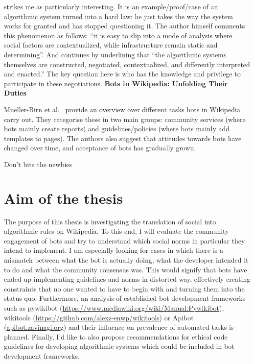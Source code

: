 \documentclass[pdftex,a4paper,11pt]{scrartcl}
\begin{document}
strikes me as particularly interesting.
It is an example/proof/case of an algorithmic system turned into a hard law: he just takes the way the system works for granted and has stopped questioning it.
The author himself comments this phenomenon as follows:
``it is easy to slip into a mode of analysis where social factors are contextualized, while infrastructure remain static and determining''.
And continues by underlining that ``the algorithmic systems themselves are constructed, negotiated, contextualized, and differently interpreted and enacted.''
The key question here is who has the knowledge and privilege to participate in these negotiations.
\newline
\newline
\textbf{Bots in Wikipedia: Unfolding Their Duties}~\cite{MuellerBirn2014}
\newline
\newline

Mueller-Birn et al.~\cite{MuellerBirn2014} provide an overview over different tasks bots in Wikipedia carry out.
They categorise these in two main groups: community services (where bots mainly create reports) and guidelines/policies (where bots mainly add templates to pages).
The authors also suggest that attitudes towards bots have changed over time, and acceptance of bots has gradually grown.


\cite{HalKitRied2011}
Don't bite the newbies


\section{Aim of the thesis}
The purpose of this thesis is investigating the translation of social into algorithmic rules on Wikipedia.
To this end, I will evaluate the community engagement of bots and try to understand which social norms in particular they intend to implement.
I am especially looking for cases in which there is a mismatch between what the bot is actually doing, what the developer intended it to do and what the community consensus was.
This would signify that bots have ended up implementing guidelines and norms in distorted way, effectively creating constraints that no one wanted to have to begin with and turning them into the status quo.
Furthermore, an analysis of established bot development frameworks such as pywikibot (\url{https://www.mediawiki.org/wiki/Manual:Pywikibot}), wikitools (\url{https://github.com/alexz-enwp/wikitools}) or Apibot (\url{apibot.zavinagi.org}) and their influence on prevalence of automated tasks is planned.
Finally, I'd like to also propose recommendations for ethical code guidelines for developing algorithmic systems which could be included in bot development frameworks.
\end{document}

